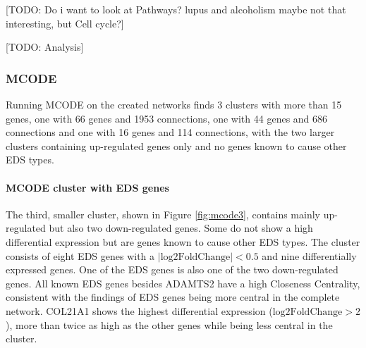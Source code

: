 [TODO: Do i want to look at Pathways? lupus and alcoholism maybe not that interesting, but Cell cycle?]

[TODO: Analysis]

\subsubsection{MCODE}
Running MCODE on the created networks finds 3 clusters with more than 15 genes, one with 66 genes and 1953 connections, one with 44 genes and 686 connections and one with 16 genes and 114 connections, with the two larger clusters containing up-regulated genes only and no genes known to cause other EDS types. %

\paragraph{MCODE cluster with EDS genes}
The third, smaller cluster, shown in Figure \ref{fig:mcode3}, contains mainly up-regulated but also two down-regulated genes. Some do not show a high differential expression but are genes known to cause other EDS types. The cluster consists of eight EDS genes with a $|\text{log2FoldChange}| < 0.5$ and nine differentially expressed genes. One of the EDS genes is also one of the two down-regulated genes. All known EDS genes besides ADAMTS2 have a high Closeness Centrality, consistent with the findings of EDS genes being more central in the complete network. COL21A1 shows the highest differential expression ($\text{log2FoldChange} > 2$), more than twice as high as the other genes while being less central in the cluster.

